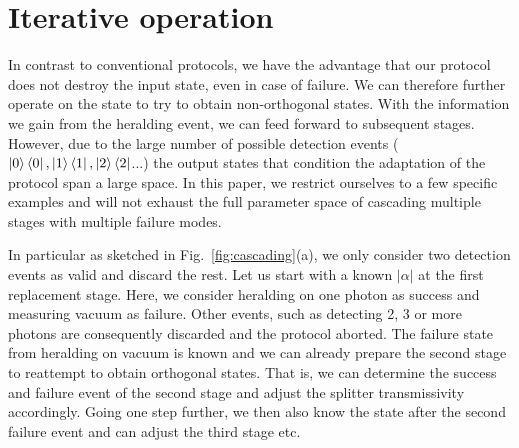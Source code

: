 \documentclass[aps,prl,twocolumn, superscriptaddress]{revtex4-1}
\begin{document}
\section{Iterative operation}
In contrast to conventional protocols, we have the advantage that our protocol does not destroy the input state, even in case of failure. We can therefore further operate on the state to try to obtain non-orthogonal states. With the information we gain from the heralding event, we can feed forward to subsequent stages. However, due to the large number of possible detection events ($\ket{0}\bra{0},\ket{1}\bra{1},\ket{2}\bra{2}$...) the output states that condition the adaptation of the protocol span a large space. In this paper, we restrict ourselves to a few specific examples and will not exhaust the full parameter space of cascading multiple stages with multiple failure modes.

In particular as sketched in Fig.~\ref{fig:cascading}(a), we only consider two detection events as valid and discard the rest. Let us start with a known $|\alpha|$ at the first replacement stage. Here, we consider heralding on one photon as success and measuring vacuum as failure. Other events, such as detecting 2, 3 or more photons are consequently discarded and the protocol aborted. The failure state from heralding on vacuum is known and we can already prepare the second stage to reattempt to obtain orthogonal states. That is, we can determine the success and failure event of the second stage and adjust the splitter transmissivity accordingly. Going one step further, we then also know the state after the second failure event and can adjust the third stage etc.
\end{document}
